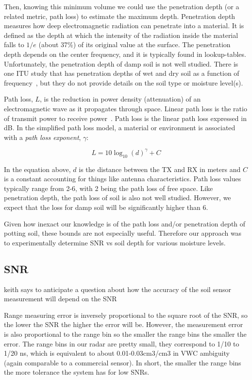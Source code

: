 \documentclass[12pt]{article}
\begin{document}
Then, knowing this minimum volume we could use the penetration depth
(or a related metric, path loss) to estimate the maximum
depth. Penetration depth measures how deep electromagnetic radiation
can penetrate into a material. It is defined as the depth at which the
intensity of the radiation inside the material falls to $1/e$ (about
37\%) of its original value at the surface. The penetration depth
depends on the center frequency, and it is typically found in
lookup-tables. Unfortunately, the penetration depth of damp soil is
not well studied. There is one ITU study that has penetration depths
of wet and dry soil as a function of
frequency~\cite{penetrationDepth}, but they do not provide details on
the soil type or moisture level(s).

Path loss, $L$, is the reduction in power density (attenuation) of an
electromagnetic wave as it propagates through space. Linear path loss
is the ratio of transmit power to receive power~\cite{goldsmith}. Path
loss is the linear path loss expressed in dB. In the simplified path
loss model, a material or environment is associated with a \emph{path
  loss exponent}, $\gamma$:

\begin{equation}
  L = 10\log_{10}(d)^\gamma + C
\end{equation}

In the equation above, $d$ is the distance between the TX and RX in
meters and $C$ is a constant accounting for things like antenna
characteristics. Path loss values typically range from 2-6, with 2
being the path loss of free space. Like penetration depth, the path
loss of soil is also not well studied. However, we expect that the
loss for damp soil will be significantly higher than 6.

Given how inexact our knowledge is of the path loss and/or penetration
depth of potting soil, these bounds are not especially
useful. Therefore our approach was to experimentally determine SNR vs
soil depth for various moisture levels. 

\subsection*{SNR}

keith says to anticipate a question about how the accuracy of the soil
sensor measurement will depend on the SNR

Range measuring error is inversely proportional to the square root of
the SNR, so the lower the SNR the higher the error will be. However,
the measurement error is also proportional to the range bin so the
smaller the range bins the smaller the error. The range bins in our
radar are pretty small, they correspond to 1/10 to 1/20 ns, which is
equivalent to about 0.01-0.03cm3/cm3 in VWC ambiguity (again
comparable to a commercial sensor). In short, the smaller the range
bins the more tolerance the system has for low SNRs.
\end{document}
